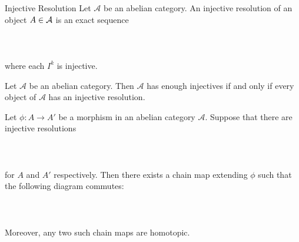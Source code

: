 \documentclass[a4paper]{article}
\begin{document}
\begin{defn}{Injective Resolution}{} Let $\mathcal{A}$ be an abelian category. An injective resolution of an object $A\in\mathcal{A}$ is an exact sequence \\~\\
\\~\\
where each $I^k$ is injective. 
\end{defn}

\begin{thm}{}{} Let $\mathcal{A}$ be an abelian category. Then $\mathcal{A}$ has enough injectives if and only if every object of $\mathcal{A}$ has an injective resolution. 
\end{thm}

\begin{prp}{}{} Let $\phi:A\to A'$ be a morphism in an abelian category $\mathcal{A}$. Suppose that there are injective resolutions \\~\\
\\~\\
for $A$ and $A'$ respectively. Then there exists a chain map extending $\phi$ such that the following diagram commutes: \\~\\
\\~\\
Moreover, any two such chain maps are homotopic. 
\end{prp}
\end{document}
